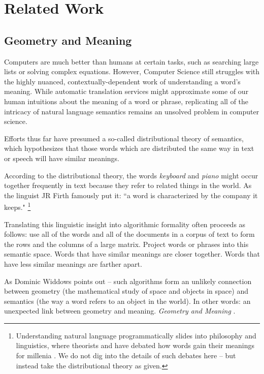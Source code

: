 \documentclass[titlepage]{article}
\begin{document}
\section{Related Work}

\subsection{Geometry and Meaning} \label{geom}
Computers are much better than humans at certain tasks, such as searching large lists or solving complex equations. However, Computer Science still struggles with the highly nuanced, contextually-dependent work of understanding a word's meaning. While automatic translation services might approximate some of our human intuitions about the meaning of a word or phrase, replicating all of the intricacy of natural language semantics remains an unsolved problem in computer science.

Efforts thus far have presumed a so-called distributional theory of semantics, which hypothesizes that those words which are distributed the same way in text or speech will have similar meanings. 

According to the distributional theory, the words \textit{keyboard} and \textit{piano} might occur together frequently in text because they refer to related things in the world. As the linguist JR Firth famously put it: ``a word is characterized by the company it keeps." \cite{firth} \footnote{Understanding natural language programmatically slides into philosophy and linguistics, where theorists and  have debated how words gain their meanings for millenia \cite{stanfordphilo}. We do not dig into the details of such debates here -- but instead take the distributional theory as given.}

Translating this linguistic insight into algorithmic formality often proceeds as follows: use all of the words and all of the documents in a corpus of text to form the rows and the columns of a large matrix. Project words or phrases into this semantic space. Words that have similar meanings are closer together. Words that have less similar meanings are farther apart.

As Dominic Widdows points out -- such algorithms form an unlikely connection between geometry (the mathematical study of space and objects in space) and semantics (the way a word refers to an object in the world). In other words: an unexpected link between geometry and meaning. \textit{Geometry and Meaning} \cite{widdows}. 
\end{document}

